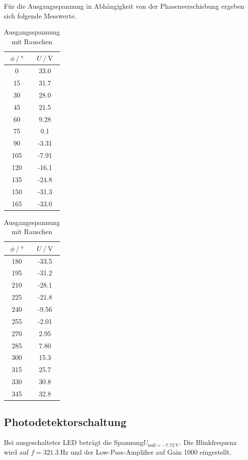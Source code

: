 Für die Ausgangsspannung in Abhängigkeit von der Phasenverschiebung ergeben sich folgende Messwerte.
\begin{table}
  \centering
  \caption{Ausgangsspannung mit Rauschen}
  \label{tab:ohne_Rauschen}
  \begin{subtable}{0.48\textwidth}
    \centering
  \begin{tabular}{cc}
    \toprule {$\phi \:/\: °$} & {$U \:/\: \si{\volt}$} \\
    \midrule
    0	& 33.0 \\
    15 & 31.7 \\
    30 & 28.0 \\
    45	& 21.5 \\
    60 & 9.28 \\
    75 & 0.1 \\
    90	& -3.31 \\
    105 & -7.91 \\
    120	& -16.1 \\
    135	& -24.8 \\
    150	& -31.3 \\
    165 & -33.0 \\
    \bottomrule
    \end{tabular}
  \end{subtable}
  \begin{subtable}{0.48\textwidth}
    \centering
  \begin{tabular}{cc}
    \toprule {$\phi \:/\: °$} & {$U \:/\: \si{\volt}$} \\
    \midrule
    180	& -33.5 \\
    195	& -31.2 \\
    210	& -28.1 \\
    225	& -21.8 \\
    240 & -9.56 \\
    255	& -2.01 \\
    270	& 2.95 \\
    285	& 7.80 \\
    300	& 15.3 \\
    315	& 25.7 \\
    330	& 30.8 \\
    345	& 32.8 \\
    \bottomrule
    \end{tabular}
  \end{subtable}
\end{table}

\subsection{Photodetektorschaltung}
Bei ausgeschalteter LED beträgt die Spannung$U_{\mathrm{null} = \SI {-7,72}{\volt}}$.
Die Blinkfrequenz wird auf $f = \SI {321,3}{\Hz}$ und der Low-Pass-Amplifier auf Gain 1000 eingestellt.

